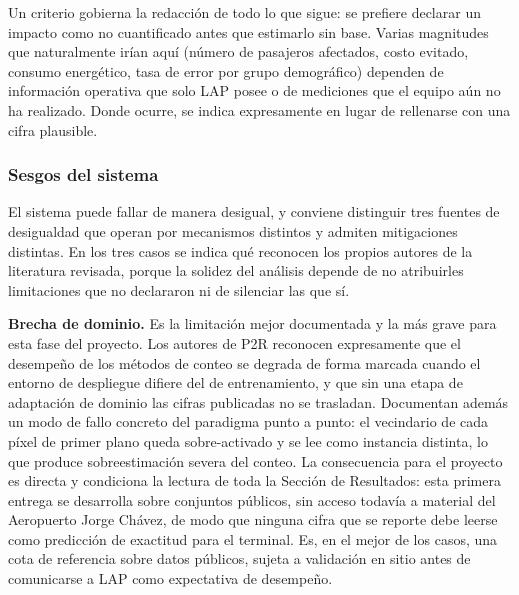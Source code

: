 Un criterio gobierna la redacción de todo lo que sigue: se prefiere
declarar un impacto como no cuantificado antes que estimarlo sin base.
Varias magnitudes que naturalmente irían aquí (número de pasajeros
afectados, costo evitado, consumo energético, tasa de error por grupo
demográfico) dependen de información operativa que solo LAP posee o de
mediciones que el equipo aún no ha realizado. Donde ocurre, se indica
expresamente en lugar de rellenarse con una cifra plausible.

\subsubsection{Sesgos del sistema}

El sistema puede fallar de manera desigual, y conviene distinguir tres
fuentes de desigualdad que operan por mecanismos distintos y admiten
mitigaciones distintas. En los tres casos se indica qué reconocen los
propios autores de la literatura revisada, porque la solidez del
análisis depende de no atribuirles limitaciones que no declararon ni de
silenciar las que sí.

\textbf{Brecha de dominio.} Es la limitación mejor documentada y la más
grave para esta fase del proyecto. Los autores de P2R
\cite{Lin_2025_CVPR} reconocen expresamente que el desempeño de los
métodos de conteo se degrada de forma marcada cuando el entorno de
despliegue difiere del de entrenamiento, y que sin una etapa de
adaptación de dominio las cifras publicadas no se trasladan. Documentan
además un modo de fallo concreto del paradigma punto a punto: el
vecindario de cada píxel de primer plano queda sobre-activado y se lee
como instancia distinta, lo que produce sobreestimación severa del
conteo. La consecuencia para el proyecto es directa y condiciona la
lectura de toda la Sección de Resultados: esta primera entrega se
desarrolla sobre conjuntos públicos, sin acceso todavía a material del
Aeropuerto Jorge Chávez, de modo que ninguna cifra que se reporte debe
leerse como predicción de exactitud para el terminal. Es, en el mejor de
los casos, una cota de referencia sobre datos públicos, sujeta a
validación en sitio antes de comunicarse a LAP como expectativa de
desempeño.

